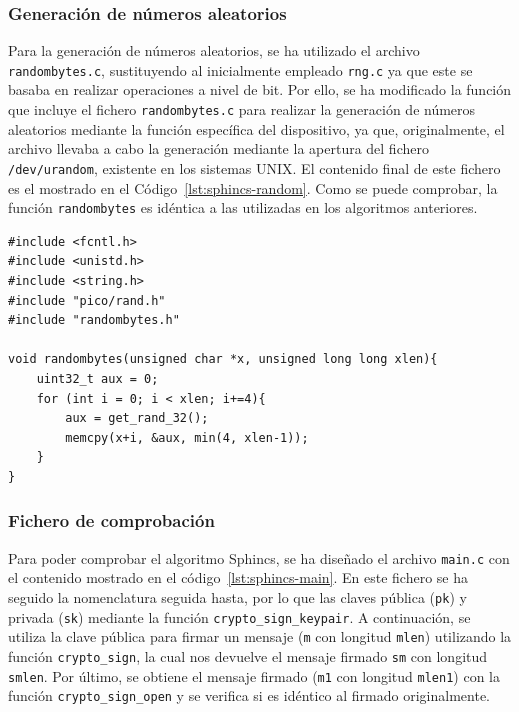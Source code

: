 \subsubsection{Generación de números aleatorios}\label{subsubsec:sphincs-random}

Para la generación de números aleatorios, se ha utilizado el archivo \texttt{randombytes.c}, sustituyendo al inicialmente empleado \texttt{rng.c} ya que este se basaba en realizar operaciones a nivel de bit.
Por ello, se ha modificado la función que incluye el fichero \texttt{randombytes.c} para realizar la generación de números aleatorios mediante la función específica del dispositivo, ya que, originalmente, el archivo llevaba a cabo la generación mediante la apertura del fichero \texttt{/dev/urandom}, existente en los sistemas UNIX.
El contenido final de este fichero es el mostrado en el Código~\ref{lst:sphincs-random}.
Como se puede comprobar, la función \texttt{randombytes} es idéntica a las utilizadas en los algoritmos anteriores.

\begin{lstlisting}[label={lst:sphincs-random},style=Cnice,firstnumber=1,caption={Archivo \texttt{Sphincs/src/randombytes.c}.}]
#include <fcntl.h>
#include <unistd.h>
#include <string.h>
#include "pico/rand.h"
#include "randombytes.h"

void randombytes(unsigned char *x, unsigned long long xlen){
    uint32_t aux = 0;
    for (int i = 0; i < xlen; i+=4){
        aux = get_rand_32();
        memcpy(x+i, &aux, min(4, xlen-1));
    }
}
\end{lstlisting}

\subsubsection{Fichero de comprobación}\label{subsubsec:sphincs-main}

Para poder comprobar el algoritmo Sphincs, se ha diseñado el archivo \texttt{main.c} con el contenido mostrado en el código~\ref{lst:sphincs-main}.
En este fichero se ha seguido la nomenclatura seguida hasta, por lo que las claves pública (\texttt{pk}) y privada (\texttt{sk}) mediante la función \texttt{crypto\_sign\_keypair}.
A continuación, se utiliza la clave pública para firmar un mensaje (\texttt{m} con longitud \texttt{mlen}) utilizando la función \texttt{crypto\_sign}, la cual nos devuelve el mensaje firmado \texttt{sm} con longitud \texttt{smlen}.
Por último, se obtiene el mensaje firmado (\texttt{m1} con longitud \texttt{mlen1}) con la función \texttt{crypto\_sign\_open} y se verifica si es idéntico al firmado originalmente.

